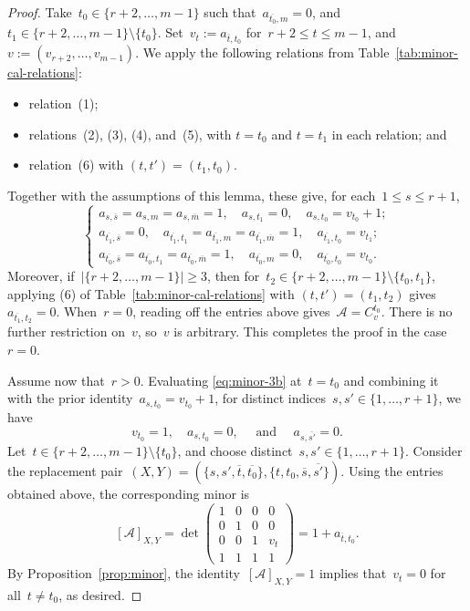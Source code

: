\documentclass[11pt]{amsart}
\theoremstyle{plain}
\numberwithin{equation}{section}
\theoremstyle{definition}
\newcommand{\cA}{\mathcal{A}}
\begin{document}
\begin{proof}
    Take~$t_0 \in \{r+2, \ldots, m-1\}$ such that~$a_{\overline{t_0}, m} = 0$, and~$t_1\in \{r+2,\ldots,m-1\}\setminus\{t_0\}$.
    Set~$v_t := a_{\overline{t},t_0}$ for~$r+2 \leq t \leq m-1$, and~$v := (v_{r+2},\ldots,v_{m-1})$.
    We apply the following relations from
    Table~\ref{tab:minor-cal-relations}:
    \begin{itemize}
        \item relation~(1);
        \item relations~(2), (3), (4), and~(5), with $t=t_0$ and $t=t_1$ in each relation; and
        \item relation~(6) with $(t,t')=(t_1,t_0)$.
    \end{itemize}
    Together with the assumptions of this lemma, these give, for each~$1\leq s\leq r+1$,
    $$
        \begin{cases}
            a_{s,\overline{s}}=a_{s,m}=a_{s,\overline{m}}=1, \quad a_{s,t_1}=0, \quad a_{s,t_0}= v_{t_0}+1; \\
            a_{\overline{t_1},\overline{s}}=0, \quad a_{\overline{t_1},t_1} = a_{\overline{t_1},m}= a_{\overline{t_1},\overline{m}}=1, \quad a_{\overline{t_1},t_0} = v_{t_1};\\
            a_{\overline{t_0},\overline{s}} = a_{\overline{t_0},t_1}= a_{\overline{t_0},\overline{m}}=1, \quad a_{\overline{t_0},m} = 0, \quad a_{\overline{t_0},t_0} = v_{t_0}.
        \end{cases}
    $$
    Moreover, if~$|\{r+2,\ldots,m-1\}| \geq 3$, then for~$t_2\in \{r+2,\ldots,m-1\}\setminus\{t_0,t_1\}$, applying (6) of Table~\ref{tab:minor-cal-relations} with $(t,t')=(t_1,t_2)$ gives~$a_{\overline{t_1},t_2}=0$.
    When~$r=0$, reading off the entries above gives~$\cA=C_v^{t_0}$.
    There is no further restriction on~$v$, so~$v$ is arbitrary.
    This completes the proof in the case~$r=0$.
    
    Assume now that~$r>0$.
    Evaluating \eqref{eq:minor-3b} at~$t=t_0$ and combining it with the prior identity~$a_{s,t_0} = v_{t_0}+ 1$, for distinct indices~$s,s'\in\{1,\ldots,r+1\}$, we have
    $$
        v_{t_0}=1,\quad a_{s,t_0}=0,\quad \text{ and } \quad a_{s,\overline{s'}}=0.
    $$
    Let~$t\in \{r+2,\ldots,m-1\}\setminus\{t_0\}$, and choose distinct~$s,s'\in \{1,\ldots,r+1\}$. 
    Consider the replacement pair~$(X,Y)=(\{s,s',\overline{t},\overline{t_0}\}, \{t,t_0,\overline{s},\overline{s'}\})$.
    Using the entries obtained above, the corresponding minor is
    $$
        [\cA]_{X,Y} = \det
            \begin{pmatrix}
                1 & 0 & 0 & 0 \\
                0 & 1 & 0 & 0 \\
                0 & 0 & 1 & v_t \\
                1 & 1 & 1 & 1
            \end{pmatrix}
        = 1 + a_{\overline{t},t_0}.
    $$
    By Proposition~\ref{prop:minor}, the identity~$[\cA]_{X,Y} = 1$ implies that~$v_t=0$ for all~$t\neq t_0$, as desired.
\end{proof}
\end{document}
